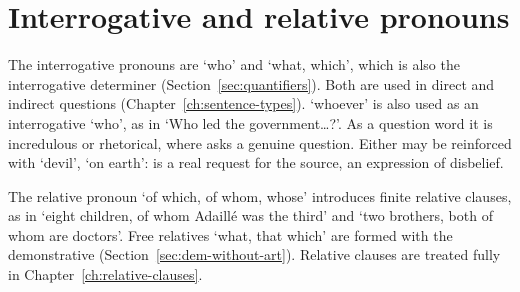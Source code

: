 \section{Interrogative and relative pronouns}\label{sec:interrogative-pronouns}
The interrogative pronouns are   `who' and  `what, which', which is also the interrogative determiner (Section~\ref{sec:quantifiers}). Both are used in direct and indirect questions (Chapter~\ref{ch:sentence-types}).
 `whoever' is also used as an interrogative `who', as in  `Who led the government\ldots?'. As a question word it is incredulous or rhetorical, where  asks a genuine question. Either may be reinforced with  `devil', `on earth':  is a real request for the source,  an expression of disbelief.

The relative pronoun  `of which, of whom, whose' introduces finite relative clauses, as in  `eight children, of whom Adaillé was the third' and  `two brothers, both of whom are doctors'. Free relatives `what, that which' are formed with the demonstrative  (Section~\ref{sec:dem-without-art}). Relative clauses are treated fully in Chapter~\ref{ch:relative-clauses}.
